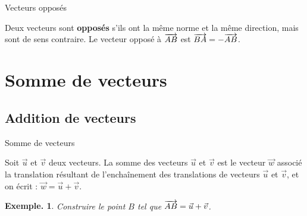 \documentclass[12pt]{article}
\theoremstyle{break}
\newtheorem*{example}{Exemple.}
\begin{document}
\vfill

\begin{definition}{Vecteurs opposés}{}
  \begin{multihide}
    Deux vecteurs sont \textbf{opposés} s'ils ont la même norme et la même direction, mais sont de sens contraire.
    Le vecteur opposé à $\overrightarrow{AB}$ est $\overrightarrow{BA} = -\overrightarrow{AB}$.
  \end{multihide}
\end{definition}


\begin{figure}[h]
  \centering
  \large
{}
\end{figure}

\vfill

\newpage

\section{Somme de vecteurs}

\subsection{Addition de vecteurs}
\begin{definition}{Somme de vecteurs}{}
  \begin{multihide}
  Soit $\vec{u}$ et $\vec{v}$ deux vecteurs. La somme des vecteurs $\vec{u}$ et $\vec{v}$ est le vecteur $\vec{w}$ associé la translation résultant de l'enchaînement des translations de vecteurs $\vec{u}$ et $\vec{v}$, et on écrit : $\vec{w} = \vec{u} + \vec{v}$.
  \end{multihide}
\end{definition}

\begin{example}
  Construire le point $B$ tel que $\overrightarrow{AB} = \vec{u} + \vec{v}$.
\end{example}
\end{document}
